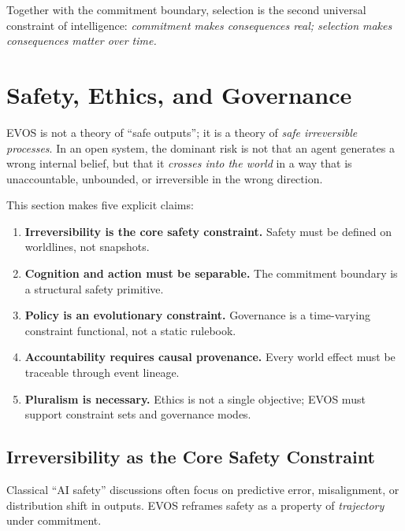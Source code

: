 \documentclass[11pt]{article}
\begin{document}
Together with the commitment boundary, selection is the second universal constraint of intelligence:
\emph{commitment makes consequences real; selection makes consequences matter over time.}


\section{Safety, Ethics, and Governance}
\label{sec:governance}

EVOS is not a theory of ``safe outputs''; it is a theory of \emph{safe irreversible processes}.
In an open system, the dominant risk is not that an agent generates a wrong internal belief,
but that it \emph{crosses into the world} in a way that is unaccountable, unbounded, or
irreversible in the wrong direction.

This section makes five explicit claims:

\begin{enumerate}
  \item \textbf{Irreversibility is the core safety constraint.} Safety must be defined on worldlines, not snapshots.
  \item \textbf{Cognition and action must be separable.} The commitment boundary is a structural safety primitive.
  \item \textbf{Policy is an evolutionary constraint.} Governance is a time-varying constraint functional, not a static rulebook.
  \item \textbf{Accountability requires causal provenance.} Every world effect must be traceable through event lineage.
  \item \textbf{Pluralism is necessary.} Ethics is not a single objective; EVOS must support constraint sets and governance modes.
\end{enumerate}

\subsection{Irreversibility as the Core Safety Constraint}
\label{sec:irreversibility-safety}

Classical ``AI safety'' discussions often focus on predictive error, misalignment, or
distribution shift in outputs. EVOS reframes safety as a property of \emph{trajectory}
under commitment.
\end{document}
